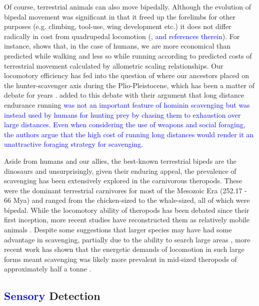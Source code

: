 \documentclass[a4paper,12pt]{article}
\begin{document}
Of course, terrestrial animals can also move bipedally. 
Although the evolution of bipedal movement was significant in that it freed up the forelimbs for other purposes (e.g. climbing, tool-use, wing development etc.) it does not differ radically in cost from quadrupedal locomotion (\cite{williams1999evolution}, \textcolor{blue}{and references therein}). 
For instance, \cite{alexander2004bipedal} shows that, in the case of humans, we are more economical than predicted while walking and less so while running according to predicted costs of terrestrial movement calculated by allometric scaling relationships.
Our locomotory efficiency has fed into the question of where our ancestors placed on the hunter-scavenger axis during the Plio-Pleistocene, which has been a matter of debate for years \citep{capaldo1995skeletal,dominguez2002hunting}.
\cite{ruxton2013endurance} added to this debate with their argument that long distance endurance running \textcolor{blue}{was not an important feature of hominin scavenging but was instead used by humans for hunting prey by chasing them to exhaustion over large distances.
Even when considering the use of weapons and social foraging, the authors argue that the high cost of running long distances would render it an unattractive foraging strategy for scavenging.}

Aside from humans and our allies, the best-known terrestrial bipeds are the dinosaurs and unsurprisingly, given their enduring appeal, the prevalence of scavenging has been extensively explored in the carnivorous theropods.
These were the dominant terrestrial carnivores for most of the Mesozoic Era (252.17 - 66 Mya) and ranged from the chicken-sized to the whale-sized, all of which were bipedal.
While the locomotory ability of theropods has been debated since their first inception, more recent studies have reconstructed them as relatively mobile animals \citep{pontzer2009biomechanics}. 
Despite some suggestions that larger species may have had some advantage in scavenging, partially due to the ability to search large areas \citep{ruxton2003could}, more recent work has shown that the energetic demands of locomotion in such large forms meant scavenging was likely more prevalent in mid-sized theropods of approximately half a tonne \citep{kane2016body}.

\subsection{\textcolor{blue}{Sensory} Detection}
\end{document}

